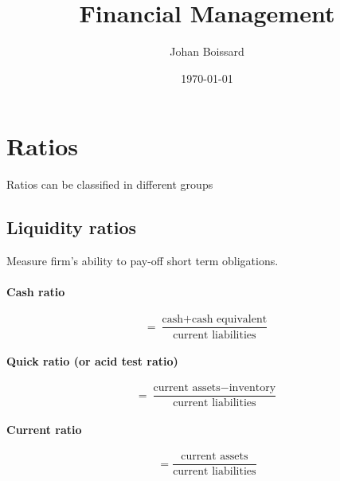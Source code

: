 \documentclass[a4paper] {scrartcl}
\author{Johan Boissard}
\date{\today}
\title{Financial Management}
\begin{document}
\maketitle

\section{Ratios}
Ratios can be classified in different groups

\subsection{Liquidity ratios} %
\label{sub:liquidity_ratios}
Measure firm's ability to pay-off short term obligations.

\paragraph{Cash ratio} %
\label{par:cash_ratio}
\begin{equation}
	= \frac{\text{cash} + \text{cash equivalent}}{\text{current liabilities}}
\end{equation}

\paragraph{Quick ratio (or acid test ratio)} %
\label{par:quick_ratio_or_acid_test_ratio_}
\begin{equation}
		= \frac{\text{current assets} - \text{inventory}}{\text{current liabilities}}
\end{equation}

\paragraph{Current ratio} %
\label{par:current_ratio}
\begin{equation}
	=\frac{\text{current assets}}{\text{current liabilities}}
\end{equation}
\end{document}
